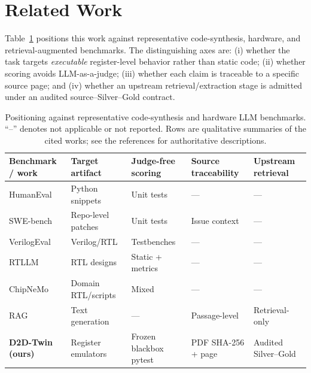 \documentclass[preprint,review]{elsarticle}
\theoremstyle{definition}
\begin{document}
\section{Related Work}
\label{sec:related}

Table~\ref{tab:related} positions this work against representative code-synthesis,
hardware, and retrieval-augmented benchmarks. The distinguishing axes are: (i) whether
the task targets \emph{executable} register-level behavior rather than static code;
(ii) whether scoring avoids LLM-as-a-judge; (iii) whether each claim is traceable to a
specific source page; and (iv) whether an upstream retrieval/extraction stage is admitted
under an audited source--Silver--Gold contract.

\begin{table}[t]
\centering
\caption{Positioning against representative code-synthesis and hardware LLM benchmarks.
``--'' denotes not applicable or not reported. Rows are qualitative summaries of the
cited works; see the references for authoritative descriptions.}
\label{tab:related}
\small
\begin{tabular}{@{}l p{2.4cm} p{2.2cm} p{2.6cm} p{2.2cm}@{}}
\toprule
Benchmark / work & Target artifact & Judge-free scoring & Source traceability & Upstream
retrieval \\
\midrule
HumanEval \cite{chen2021evaluating} & Python snippets & Unit tests & --- & --- \\
SWE-bench \cite{jimenez2024swebench} & Repo-level patches & Unit tests & Issue context & --- \\
VerilogEval \cite{thakur2023verilogeval} & Verilog/RTL & Testbenches & --- & --- \\
RTLLM \cite{lu2024rtllm} & RTL designs & Static + metrics & --- & --- \\
ChipNeMo \cite{liu2023chipnemo} & Domain RTL/scripts & Mixed & --- & --- \\
RAG \cite{lewis2020retrieval} & Text generation & --- & Passage-level & Retrieval-only \\
\textbf{D2D-Twin (ours)} & Register emulators & Frozen blackbox pytest & PDF SHA-256 + page & Audited
Silver--Gold \\
\bottomrule
\end{tabular}
\end{table}
\end{document}
